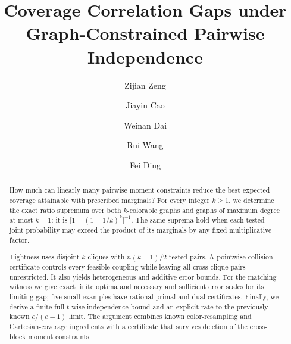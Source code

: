 \documentclass[manuscript,11pt,screen,nonacm,natbib=false]{acmart}
\title{Coverage Correlation Gaps under Graph-Constrained Pairwise Independence}
\author{Zijian Zeng}
\affiliation{\institution{UCSI University}\city{}\country{Malaysia}}
\author{Jiayin Cao}
\affiliation{\institution{Ningbo University}\city{}\country{China}}
\author{Weinan Dai}
\affiliation{\institution{Zhejiang University}\city{}\country{China}}
\author{Rui Wang}
\affiliation{\institution{Nanchang Institute of Technology}\city{}\country{China}}
\author{Fei Ding}
\affiliation{\institution{Alibaba Group}\city{}\country{China}}
\date{}
\begin{document}
\singlespacing
\begin{abstract}
\normalsize
How much can linearly many pairwise moment constraints reduce the best
expected coverage attainable with prescribed marginals? For every integer
\(k\geq1\), we determine the exact ratio supremum over both \(k\)-colorable
graphs and graphs of maximum degree at most \(k-1\): it is
\(\bigl[1-(1-1/k)^k\bigr]^{-1}\). The same suprema hold when each tested
joint probability may exceed the product of its marginals by any fixed
multiplicative factor.

Tightness uses disjoint \(k\)-cliques with \(n(k-1)/2\) tested pairs.
A pointwise collision certificate controls every feasible coupling while
leaving all cross-clique pairs unrestricted. It also yields heterogeneous
and additive error bounds. For the matching witness we give exact finite
optima and necessary and sufficient error scales for its limiting gap;
five small examples have rational primal and dual certificates. Finally,
we derive a finite full \(t\)-wise independence bound and an explicit rate
to the previously known \(e/(e-1)\) limit. The argument combines known
color-resampling and Cartesian-coverage ingredients with a certificate
that survives deletion of the cross-block moment constraints.
\end{abstract}
\hypersetup{pageanchor=false}
\maketitle
{}
\enlargethispage{-12pt}
\thispagestyle{empty}
\clearpage
\setcounter{page}{1}
\hypersetup{pageanchor=true}
\pagestyle{submission}



\clearpage
\onehalfspacing
\end{document}
